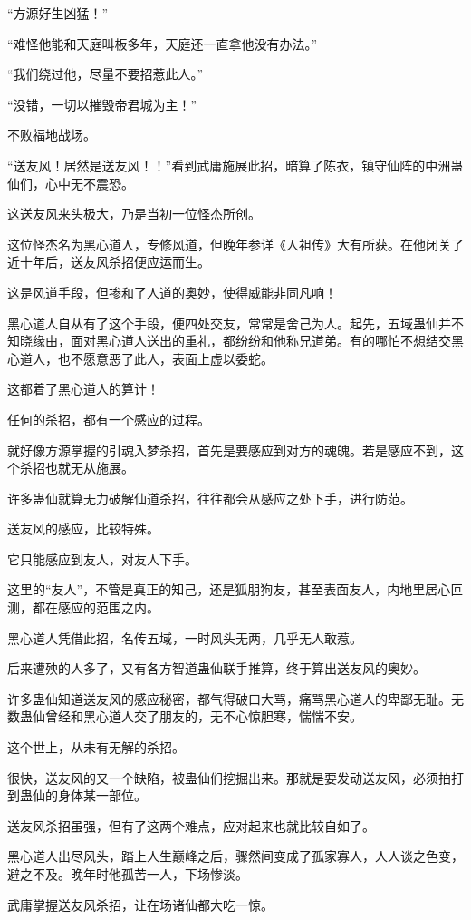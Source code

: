 \begin{this_body}
“方源好生凶猛！”

“难怪他能和天庭叫板多年，天庭还一直拿他没有办法。”

“我们绕过他，尽量不要招惹此人。”

“没错，一切以摧毁帝君城为主！”

不败福地战场。

“送友风！居然是送友风！！”看到武庸施展此招，暗算了陈衣，镇守仙阵的中洲蛊仙们，心中无不震恐。

这送友风来头极大，乃是当初一位怪杰所创。

这位怪杰名为黑心道人，专修风道，但晚年参详《人祖传》大有所获。在他闭关了近十年后，送友风杀招便应运而生。

这是风道手段，但掺和了人道的奥妙，使得威能非同凡响！

黑心道人自从有了这个手段，便四处交友，常常是舍己为人。起先，五域蛊仙并不知晓缘由，面对黑心道人送出的重礼，都纷纷和他称兄道弟。有的哪怕不想结交黑心道人，也不愿意恶了此人，表面上虚以委蛇。

这都着了黑心道人的算计！

任何的杀招，都有一个感应的过程。

就好像方源掌握的引魂入梦杀招，首先是要感应到对方的魂魄。若是感应不到，这个杀招也就无从施展。

许多蛊仙就算无力破解仙道杀招，往往都会从感应之处下手，进行防范。

送友风的感应，比较特殊。

它只能感应到友人，对友人下手。

这里的“友人”，不管是真正的知己，还是狐朋狗友，甚至表面友人，内地里居心叵测，都在感应的范围之内。

黑心道人凭借此招，名传五域，一时风头无两，几乎无人敢惹。

后来遭殃的人多了，又有各方智道蛊仙联手推算，终于算出送友风的奥妙。

许多蛊仙知道送友风的感应秘密，都气得破口大骂，痛骂黑心道人的卑鄙无耻。无数蛊仙曾经和黑心道人交了朋友的，无不心惊胆寒，惴惴不安。

这个世上，从未有无解的杀招。

很快，送友风的又一个缺陷，被蛊仙们挖掘出来。那就是要发动送友风，必须拍打到蛊仙的身体某一部位。

送友风杀招虽强，但有了这两个难点，应对起来也就比较自如了。

黑心道人出尽风头，踏上人生巅峰之后，骤然间变成了孤家寡人，人人谈之色变，避之不及。晚年时他孤苦一人，下场惨淡。

武庸掌握送友风杀招，让在场诸仙都大吃一惊。


\end{this_body}
